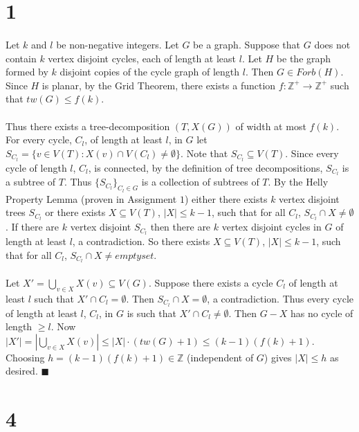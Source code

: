 \documentclass[letterpaper,12pt,oneside,onecolumn]{report}
\begin{document}
\section*{1}
\paragraph{}
Let $k$ and $l$ be non-negative integers. Let $G$ be a graph. Suppose that $G$ does not contain $k$ vertex disjoint cycles, each of length at least $l$. Let $H$ be the graph formed by $k$ disjoint copies of the cycle graph of length $l$. Then $G \in Forb(H)$. Since $H$ is planar, by the Grid Theorem, there exists a function $f: \mathbb{Z}^+ \rightarrow \mathbb{Z}^+$ such that $tw(G) \leq f(k)$.
\paragraph{}
Thus there exists a tree-decomposition $(T, X(G))$ of width at most $f(k)$. For every cycle, $C_l$, of length at least $l$,  in $G$ let $S_{C_l} = \{ v \in V(T) : X(v) \cap V(C_l) \neq \emptyset \}$. Note that $S_{C_l} \subseteq V(T)$. Since every cycle of length $l$, $C_l$, is connected, by the definition of tree decompositions, $S_{C_l}$ is a subtree of $T$. Thus $\{S_{C_l}\}_{C_l \in G}$ is a collection of subtrees of $T$. By the Helly Property Lemma (proven in Assignment $1$) either there exists $k$ vertex disjoint trees $S_{C_l}$ or there exists $X \subseteq V(T)$, $|X| \leq k-1$, such that for all $C_l$, $S_{C_l} \cap X \neq \emptyset$. If there are $k$ vertex disjoint $S_{C_l}$ then there are $k$ vertex disjoint cycles in $G$ of length at least $l$, a contradiction. So there exists $X \subseteq V(T)$, $|X| \leq k-1$, such that for all $C_l$, $S_{C_l}\cap X \neq emptyset$.
\paragraph{}
Let $X' = \bigcup_{v\in X} X(v) \subseteq V(G)$. Suppose there exists a cycle $C_l$ of length at least $l$ such that $X' \cap C_l = \emptyset$. Then $S_{C_l} \cap X = \emptyset$, a contradiction. Thus every cycle of length at least $l$, $C_l$, in $G$ is such that $X' \cap C_l \neq \emptyset.$ Then $G-X$ has no cycle of length $\geq l$. Now $|X'| = |\bigcup_{v\in X} X(v)| \leq |X|\cdot (tw(G) + 1) \leq (k-1)(f(k) + 1)$.  Choosing $h = (k-1)(f(k) + 1) \in \mathbb{Z}$ (independent of $G$) gives $|X| \leq h$ as desired. $\blacksquare$ 

\section*{4}
\end{document}

